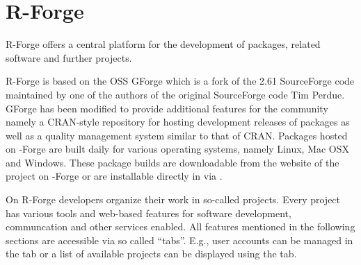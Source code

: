 \section{R-Forge}
R-Forge offers a central platform for the development of \R{} packages, \R{}
related software and further projects. 

R-Forge is based on the OSS GForge \citep{forge:copeland_et_al:2006} which is a
fork of the 2.61 SourceForge code maintained by one of the authors of
the original SourceForge code Tim Perdue. GForge has been modified to
provide additional features for the \R{} community namely a
CRAN-style repository for hosting development releases of \R{}
packages as well as a quality management system similar to that of
CRAN.
Packages hosted on \R{}-Forge are built daily
for various operating systems, namely Linux, Mac OSX and Windows. These
package builds are downloadable from the website of the project on
\R{}-Forge or are installable directly in \R{} via
.






On R-Forge developers organize their work
in so-called projects. Every project has various tools and web-based features
for software development, communcation and other services enabled. All
features mentioned in the 
following sections are accessible via so called 
``tabs''. E.g., user accounts can be managed in the  tab or
a list of available projects can be displayed using the
 tab.

